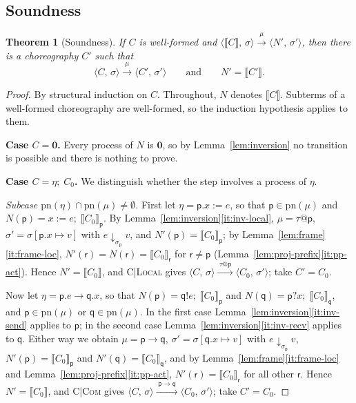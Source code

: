 \documentclass[11pt]{article}
\makeatletter
\theoremstyle{plain}
\newtheorem{theorem}{Theorem}[section]
\theoremstyle{definition}
\theoremstyle{remark}
\newcommand{\nil}{\mathbf{0}}
\newcommand{\seq}{;\;}
\newcommand{\pp}{\mathsf{p}}
\newcommand{\qq}{\mathsf{q}}
\newcommand{\rr}{\mathsf{r}}
\newcommand{\pn}{\mathrm{pn}}
\newcommand{\eval}[3]{#1 \downarrow_{#2} #3}
\newcommand{\conf}[2]{\langle #1,\, #2\rangle}
\newcommand{\lto}[1]{\xrightarrow{\;#1\;}}
\newcommand{\proj}[2]{\llbracket #1 \rrbracket_{#2}}
\newcommand{\projn}[1]{\llbracket #1 \rrbracket}
\newcommand{\tauat}[1]{\tau\mathord{@}#1}
\newcommand{\upd}[3]{#1[#2 \mapsto #3]}
\newcommand{\rn}[1]{{\normalfont\scshape #1}}
\newcommand{\case}[1]{\medskip\noindent\textbf{Case #1.}\;}
\newcommand{\subcase}[1]{\smallskip\noindent\textit{Subcase #1.}\;}
\makeatother
\begin{document}
\subsection{Soundness}

\begin{theorem}[Soundness]\label{thm:soundness}
  If $C$ is well-formed and $\conf{\projn{C}}{\sigma}\lto{\mu}\conf{N'}{\sigma'}$,
  then there is a choreography $C'$ such that
  \[
    \conf{C}{\sigma}\lto{\mu}\conf{C'}{\sigma'}
    \qquad\text{and}\qquad
    N' = \projn{C'}.
  \]
\end{theorem}
\begin{proof}
  By structural induction on $C$.  Throughout, $N$ denotes $\projn{C}$.
  Subterms of a well-formed choreography are well-formed, so the induction
  hypothesis applies to them.

  \case{$C = \nil$}
  Every process of $N$ is $\nil$, so by Lemma~\ref{lem:inversion} no
  transition is possible and there is nothing to prove.

  \case{$C = \eta\seq C_0$}
  We distinguish whether the step involves a process of $\eta$.

  \subcase{$\pn(\eta)\cap\pn(\mu) \neq \emptyset$}
  First let $\eta = \pp.x := e$, so that $\pp\in\pn(\mu)$ and
  $N(\pp) = x := e\seq\proj{C_0}{\pp}$.  By
  Lemma~\ref{lem:inversion}\ref{it:inv-local}, $\mu = \tauat\pp$,
  $\sigma' = \upd{\sigma}{\pp.x}{v}$ with $\eval{e}{\sigma_\pp}{v}$, and
  $N'(\pp) = \proj{C_0}{\pp}$; by Lemma~\ref{lem:frame}\ref{it:frame-loc},
  $N'(\rr) = N(\rr) = \proj{C_0}{\rr}$ for $\rr\neq\pp$
  (Lemma~\ref{lem:proj-prefix}\ref{it:pp-act}).  Hence $N' = \projn{C_0}$,
  and \rn{C|Local} gives $\conf{C}{\sigma}\lto{\tauat\pp}\conf{C_0}{\sigma'}$;
  take $C' = C_0$.

  Now let $\eta = \pp.e\to\qq.x$, so that $N(\pp) = \qq!e\seq\proj{C_0}{\pp}$
  and $N(\qq) = \pp?x\seq\proj{C_0}{\qq}$, and $\pp\in\pn(\mu)$ or
  $\qq\in\pn(\mu)$.  In the first case Lemma~\ref{lem:inversion}\ref{it:inv-send}
  applies to $\pp$; in the second case Lemma~\ref{lem:inversion}\ref{it:inv-recv}
  applies to $\qq$.  Either way we obtain $\mu = \pp\to\qq$,
  $\sigma' = \upd{\sigma}{\qq.x}{v}$ with $\eval{e}{\sigma_\pp}{v}$,
  $N'(\pp) = \proj{C_0}{\pp}$ and $N'(\qq) = \proj{C_0}{\qq}$, and by
  Lemma~\ref{lem:frame}\ref{it:frame-loc} and
  Lemma~\ref{lem:proj-prefix}\ref{it:pp-act}, $N'(\rr) = \proj{C_0}{\rr}$ for
  all other $\rr$.  Hence $N' = \projn{C_0}$, and \rn{C|Com} gives
  $\conf{C}{\sigma}\lto{\pp\to\qq}\conf{C_0}{\sigma'}$; take $C' = C_0$.


\end{proof}
\end{document}
